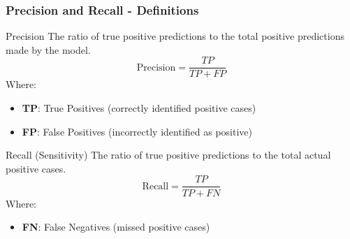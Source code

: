 \documentclass[aspectratio=169]{beamer}
\begin{document}
\begin{frame}[fragile]
    \frametitle{Precision and Recall - Definitions}
    \begin{block}{Precision}
        The ratio of true positive predictions to the total positive predictions made by the model.
        \begin{equation}
        \text{Precision} = \frac{TP}{TP + FP}
        \end{equation}
        Where:
        \begin{itemize}
            \item \textbf{TP}: True Positives (correctly identified positive cases)
            \item \textbf{FP}: False Positives (incorrectly identified as positive)
        \end{itemize}
    \end{block}

    \begin{block}{Recall (Sensitivity)}
        The ratio of true positive predictions to the total actual positive cases.
        \begin{equation}
        \text{Recall} = \frac{TP}{TP + FN}
        \end{equation}
        Where:
        \begin{itemize}
            \item \textbf{FN}: False Negatives (missed positive cases)
        \end{itemize}
    \end{block}
\end{frame}
\end{document}
